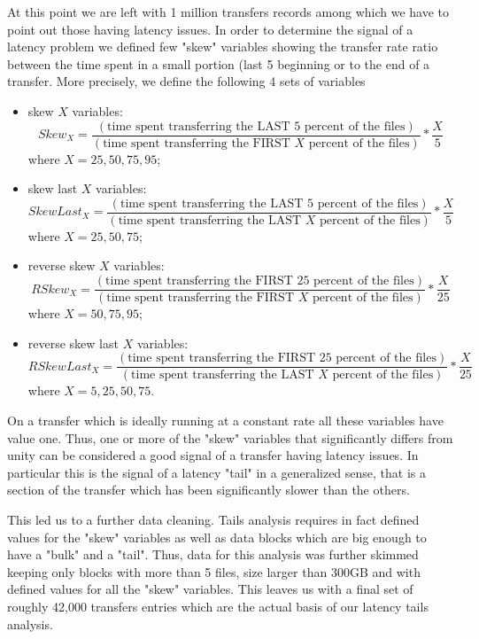 At this point we are left with 1 million transfers records among which
we have to point out those having latency issues.  In order to
determine the signal of a latency problem we defined few "skew"
variables showing the transfer rate ratio between the time spent in a
small portion (last 5%
beginning or to the end of a transfer.  More precisely, we define the
following 4 sets of variables

\begin{itemize}
\item skew $X$ variables: 
  \begin{equation}
  Skew_X=\frac{\left( \mbox{time spent transferring the LAST 5 percent of the files} \right)}{ \left( \mbox{time spent transferring the FIRST } X \mbox{ percent of the files} \right)} * \frac{X}{5} 
   \end{equation}
   where $X=25,50,75,95$;
\item skew last $X$ variables: 
  \begin{equation}
   SkewLast_X=\frac{\left( \mbox{time spent transferring the LAST 5 percent of the files}\right)}{\left(\mbox{time spent transferring the LAST } X \mbox{ percent of the files}\right)} * \frac{X}{5}
  \end{equation} 
   where $X=25,50,75$;
\item reverse skew  $X$ variables: 
  \begin{equation}
    RSkew_X=\frac{\left( \mbox{time spent transferring the FIRST 25 percent of the files}\right)}{\left( \mbox{time spent transferring the FIRST }X \mbox{ percent of the files}\right)} *  \frac{X}{25} 
  \end{equation}  
   where $X=50,75,95$;
\item reverse skew last $X$ variables: 
  \begin{equation}
    RSkewLast_X=\frac{\left(\mbox{time spent transferring the FIRST 25 percent of the files}\right)}{ \left(\mbox{time spent transferring the LAST }X\mbox{ percent of the files}\right)} * \frac{X}{25} 
  \end{equation}
   where $X=5,25,50,75$.
\end{itemize}

On a transfer which is ideally running at a constant rate all these
variables have value one. Thus, one or more of the "skew" variables
that significantly differs from unity can be considered a good signal
of a transfer having latency issues. In particular this is the signal
of a latency "tail" in a generalized sense, that is a section of the
transfer which has been significantly slower than the others.

This led us to a further data cleaning. Tails analysis requires in
fact defined values for the "skew" variables as well as data blocks
which are big enough to have a "bulk" and a "tail". Thus, data for
this analysis was further skimmed keeping only blocks with more than 5
files, size larger than 300GB and with defined values for all the
"skew" variables. This leaves us with a final set of roughly 42,000
transfers entries which are the actual basis of our latency tails
analysis.

